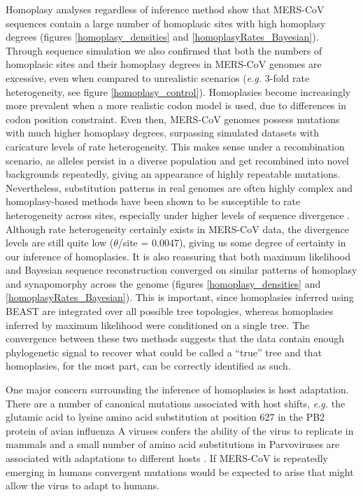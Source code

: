 \documentclass[11pt,oneside,letterpaper]{article}
\begin{document}
Homoplasy analyses regardless of inference method show that MERS-CoV sequences contain a large number of homoplasic sites with high homoplasy degrees (figures \ref{homoplasy_densities} and \ref{homoplasyRates_Bayesian}).
Through sequence simulation we also confirmed that both the numbers of homoplasic sites and their homoplasy degrees in MERS-CoV genomes are excessive, even when compared to unrealistic scenarios (\textit{e.g.} 3-fold rate heterogeneity, see figure \ref{homoplasy_control}).
Homoplasies become increasingly more prevalent when a more realistic codon model is used, due to differences in codon position constraint.
Even then, MERS-CoV genomes possess mutations with much higher homoplasy degrees, surpassing simulated datasets with caricature levels of rate heterogeneity.
This makes sense under a recombination scenario, as alleles persist in a diverse population and get recombined into novel backgrounds repeatedly, giving an appearance of highly repeatable mutations.
Nevertheless, substitution patterns in real genomes are often highly complex and homoplasy-based methods have been shown to be susceptible to rate heterogeneity across sites, especially under higher levels of sequence divergence \citep{posada_evaluation_2001}.
Although rate heterogeneity certainly exists in MERS-CoV data, the divergence levels are still quite low ($\theta$/site = 0.0047), giving us some degree of certainty in our inference of homoplasies.
It is also reassuring that both maximum likelihood and Bayesian sequence reconstruction converged on similar patterns of homoplasy and synapomorphy across the genome (figures \ref{homoplasy_densities} and \ref{homoplasyRates_Bayesian}).
This is important, since homoplasies inferred using BEAST are integrated over all possible tree topologies, whereas homoplasies inferred by maximum likelihood were conditioned on a single tree.
The convergence between these two methods suggests that the data contain enough phylogenetic signal to recover what could be called a ``true'' tree and that homoplasies, for the most part, can be correctly identified as such.

One major concern surrounding the inference of homoplasies is host adaptation.
There are a number of canonical mutations associated with host shifts, \textit{e.g.} the glutamic acid to lysine amino acid substitution at position 627 in the PB2 protein of avian influenza A viruses confers the ability of the virus to replicate in mammals \citep{subbarao_1993} and a small number of amino acid substitutions in Parvoviruses are associated with adaptations to different hosts \citep{chang_1992}.
If MERS-CoV is repeatedly emerging in humans convergent mutations would be expected to arise that might allow the virus to adapt to humans.
\end{document}
